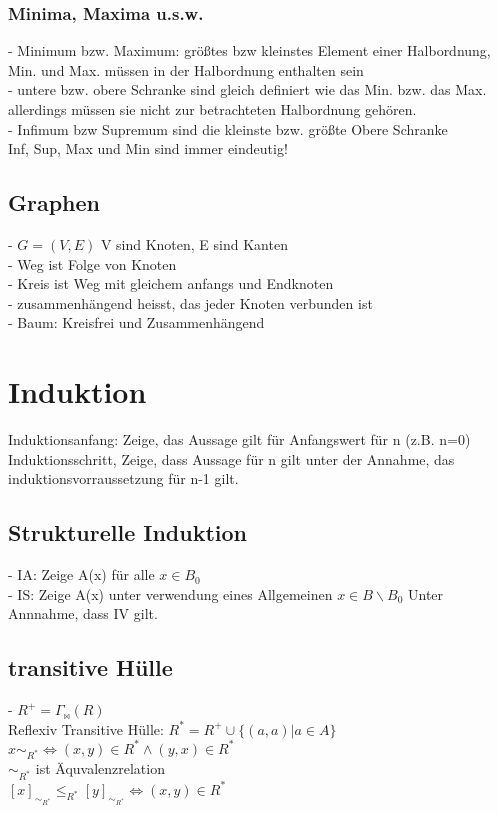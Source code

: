\documentclass[a4paper]{scrartcl}
\begin{document}
 \subsubsection{Minima, Maxima u.s.w.}
 - Minimum bzw. Maximum: größtes bzw kleinstes Element einer Halbordnung, Min. und Max. müssen in der Halbordnung enthalten sein\\
 - untere bzw. obere Schranke sind gleich definiert wie das Min. bzw. das Max. allerdings müssen sie nicht zur betrachteten Halbordnung gehören.\\
 - Infimum bzw Supremum sind die kleinste bzw. größte Obere Schranke\\
 
Inf, Sup, Max und Min sind immer eindeutig!\\

\subsection{Graphen}
- $G = (V,E)$ V sind Knoten, E sind Kanten\\
- Weg ist Folge von Knoten\\
- Kreis ist Weg mit gleichem anfangs und Endknoten\\
- zusammenhängend heisst, das jeder Knoten verbunden ist\\
- Baum: Kreisfrei und Zusammenhängend\\

\section{Induktion}
Induktionsanfang: Zeige, das Aussage gilt für Anfangswert für n (z.B. n=0)\\
Induktionsschritt, Zeige, dass Aussage für n gilt unter der Annahme, das induktionsvorraussetzung für n-1 gilt.

\subsection{Strukturelle Induktion}
- IA: Zeige A(x) für alle $x \in B_0$\\
- IS: Zeige A(x) unter verwendung eines Allgemeinen $x\in B \backslash B_0$ Unter Annnahme, dass IV gilt.
\subsection{transitive Hülle}
- $R^+ = \Gamma_{\Join }(R)$\\
Reflexiv Transitive Hülle: $R^* = R^+ \cup \{(a,a)| a\in A\}$\\
$x \sim _{R^*} \Leftrightarrow (x,y) \in R^* \wedge (y,x)\in R^*$\\
$\sim _{R^*}$ ist Äquvalenzrelation\\
$[x]_{\sim _{R^*}} \leq_{R^*} [y]_{\sim _{R^*}} \Leftrightarrow (x,y)\in R^*$\\
\end{document}
